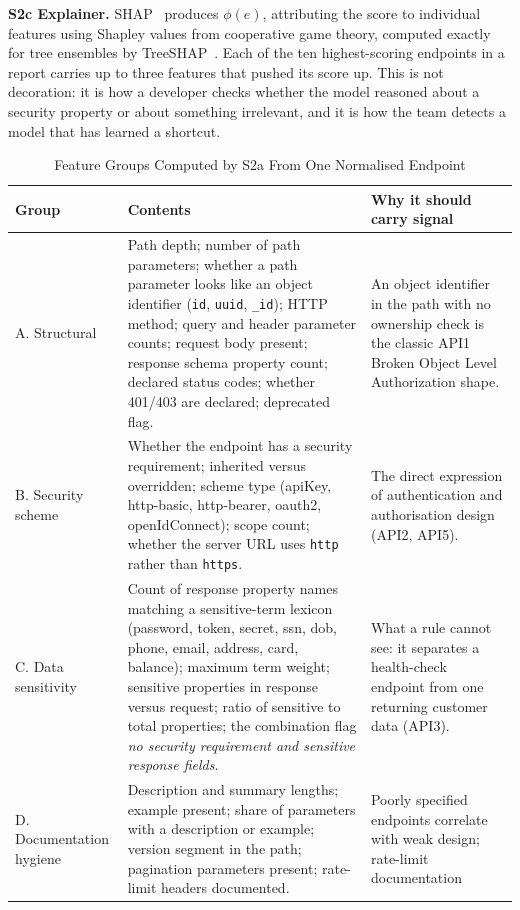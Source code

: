 \documentclass[conference]{IEEEtran}
\begin{document}
\textbf{S2c Explainer.} SHAP~\cite{shap} produces $\phi(e)$, attributing the score to
individual features using Shapley values from cooperative game theory, computed exactly for tree ensembles by TreeSHAP~\cite{treeshap}. Each of the ten
highest-scoring endpoints in a report carries up to three features that pushed its score up. This is not decoration:
it is how a developer checks whether the model reasoned about a security property or about
something irrelevant, and it is how the team detects a model that has learned a shortcut.

\begin{table}[!t]
\caption{Feature Groups Computed by S2a From One Normalised Endpoint}
\label{tab:features}
\centering
\footnotesize
\begin{tabularx}{\textwidth}{L{2.2cm} Y L{4.6cm}}
\toprule
\textbf{Group} & \textbf{Contents} & \textbf{Why it should carry signal}\\
\midrule
A. Structural & Path depth; number of path parameters; whether a path parameter looks like an
object identifier (\texttt{id}, \texttt{uuid}, \texttt{\_id}); HTTP method; query and header
parameter counts; request body present; response schema property count; declared status
codes; whether 401/403 are declared; deprecated flag. & An object identifier in the path with
no ownership check is the classic API1 Broken Object Level Authorization shape.\\
B. Security scheme & Whether the endpoint has a security requirement; inherited versus
overridden; scheme type (apiKey, http-basic, http-bearer, oauth2, openIdConnect); scope
count; whether the server URL uses \texttt{http} rather than \texttt{https}. & The direct
expression of authentication and authorisation design (API2, API5).\\
C. Data sensitivity & Count of response property names matching a sensitive-term lexicon
(password, token, secret, ssn, dob, phone, email, address, card, balance); maximum term
weight; sensitive properties in response versus request; ratio of sensitive to total
properties; the combination flag \emph{no security requirement and sensitive response
fields}. & What a rule cannot see: it separates a health-check endpoint from one returning
customer data (API3).\\
D. Documentation hygiene & Description and summary lengths; example present; share of
parameters with a description or example; version segment in the path; pagination parameters present; rate-limit headers
documented. & Poorly specified endpoints correlate with weak design; rate-limit documentation

\end{tabularx}
\end{table}
\end{document}
